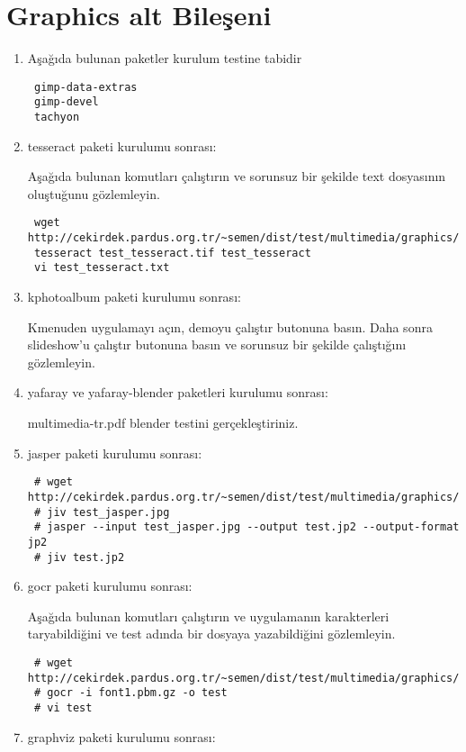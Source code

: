 \documentclass[a4paper,10pt]{article}
\begin{document}
\section{Graphics alt Bileşeni}
\begin{enumerate}
 \item Aşağıda bulunan paketler kurulum testine tabidir
\begin{verbatim}
 gimp-data-extras
 gimp-devel
 tachyon
\end{verbatim}
\item tesseract paketi kurulumu sonrası:

Aşağıda bulunan komutları çalıştırın ve sorunsuz bir şekilde text dosyasının oluştuğunu gözlemleyin.
\begin{verbatim}
 wget http://cekirdek.pardus.org.tr/~semen/dist/test/multimedia/graphics/test_tesseract.tif
 tesseract test_tesseract.tif test_tesseract
 vi test_tesseract.txt
\end{verbatim}


\item kphotoalbum paketi kurulumu sonrası:

Kmenuden uygulamayı açın, demoyu çalıştır butonuna basın. Daha sonra slideshow'u çalıştır butonuna basın ve sorunsuz bir şekilde çalıştığını gözlemleyin.

\item yafaray ve yafaray-blender paketleri kurulumu sonrası:

multimedia-tr.pdf blender testini gerçekleştiriniz.
\item jasper paketi kurulumu sonrası:

\begin{verbatim}
 # wget http://cekirdek.pardus.org.tr/~semen/dist/test/multimedia/graphics/test_jasper.jpg
 # jiv test_jasper.jpg
 # jasper --input test_jasper.jpg --output test.jp2 --output-format jp2
 # jiv test.jp2
\end{verbatim}


 \item gocr paketi kurulumu sonrası:

Aşağıda bulunan komutları çalıştırın ve uygulamanın karakterleri taryabildiğini ve test adında bir dosyaya yazabildiğini gözlemleyin.
\begin{verbatim}
 # wget http://cekirdek.pardus.org.tr/~semen/dist/test/multimedia/graphics/font1.pbm.gz
 # gocr -i font1.pbm.gz -o test
 # vi test
\end{verbatim}

\item graphviz paketi kurulumu sonrası:


\end{enumerate}
\end{document}
